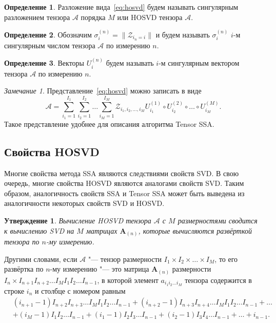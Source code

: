 \documentclass[specialist,
    substylefile = spbu_report.rtx,
    subf,href,colorlinks=true, 12pt]{disser}
\theoremstyle{plain}
\newtheorem{statement}{Утверждение}[section]
\theoremstyle{definition}
\newtheorem{definition}{Определение}[section]
\theoremstyle{remark}
\newtheorem*{remark}{Замечание}
\begin{document}
    \begin{definition}
        \label{def:hosvd}
        Разложение вида~\eqref{eq:hosvd} будем называть сингулярным разложением тензора $\mathcal{A}$ порядка $M$ или
        HOSVD тензора $\mathcal{A}$.
    \end{definition}
    \begin{definition}
        \label{def:singular-value}
        Обозначим $\sigma_i^{(n)}=\|\mathcal Z_{i_n=i}\|$ и будем называть $\sigma_i^{(n)}$ $i$-м сингулярным числом
        тензора $\mathcal A$ по измерению $n$.
    \end{definition}
    \begin{definition}
        \label{def:singular-tensor}
        Векторы $U_i^{(n)}$ будем называть $i$-м сингулярным вектором тензора $\mathcal A$ по измерению $n$.
    \end{definition}
    \begin{remark}
        Представление~\eqref{eq:hosvd} можно записать в виде
        \begin{equation}
            \mathcal{A}=\sum_{i_1=1}^{I_1} \sum_{i_2=1}^{I_2}\ldots \sum_{i_M=1}^{I_M} \mathcal{Z}_{i_1,i_2,\ldots,i_M}
            U^{(1)}_{i_1} \circ U^{(2)}_{i_2} \circ \ldots\circ U^{(M)}_{i_M}.\label{eq:sum-hosvd}
        \end{equation}
        Такое представление удобнее для описания алгоритма Tensor SSA\@.
    \end{remark}

    \subsection{Свойства HOSVD}\label{subsec:hosvd-properties}
    Многие свойства метода SSA являются следствиями свойств SVD\@.
    В свою очередь, многие свойства HOSVD являются аналогами свойств SVD\@.
    Таким образом, аналогичность свойств SSA и Tensor SSA может быть выведена из аналогичности некоторых свойств SVD и HOSVD\@.
    \begin{statement}
        Вычисление \emph{HOSVD} тензора $\mathcal{A}$ с $M$ размерностями сводится к вычислению \emph{SVD} на $M$ матрицах $\mathbf{A}_{(n)}$,
        которые вычисляются развёрткой тензора по $n$-му измерению.
    \end{statement}
    Другими словами, если $\mathcal{A}$ "--- тензор размерности $I_1\times I_2\times\ldots\times I_M$, то его развёртка
    по $n$-му измерению "--- это матрица $\mathbf{A}_{(n)}$ размерности $I_n\times I_{n+1}I_{n+2}\ldots I_{M}I_{1}I_{2}\ldots
    I_{n-1}$, в которой элемент $a_{i_1 i_2\ldots i_M}$ тензора содержится в строке $i_n$ и столбце с номером равным
    \[\begin{aligned}
          &(i_{n+1} - 1)I_{n+2}I_{n+3}\ldots I_{M}I_1 I_2\ldots I_{n-1} + (i_{n+2} - 1)I_{n+3}I_{n+4}\ldots I_M I_1 I_2 \ldots
          I_{n-1} + \dots \\
          &+(i_M - 1)I_1 I_2 \ldots I_{n-1} + (i_1 - 1)I_2 I_3\ldots I_{n-1} + (i_2 - 1)I_3 I_4\ldots I_{n-1} + \dots + i_{n-1}.
    \end{aligned}
    \]
\end{document}
